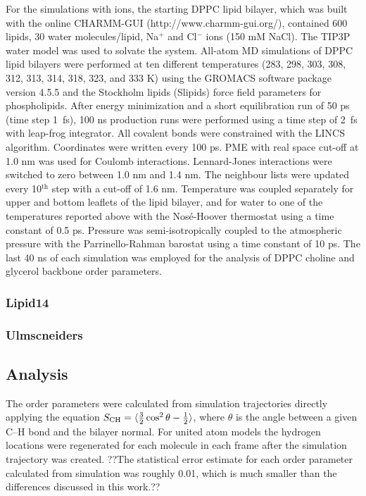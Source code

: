 \documentclass[pre,aps,floatfix,authordate1-4,twocolumn]{revtex4-1}
\begin{document}
For the simulations with ions, the starting DPPC lipid bilayer, which was built with the online CHARMM-GUI
(http://www.charmm-gui.org/), contained 600 lipids, 30 water molecules/lipid, Na$^+$ and Cl$^-$ ions (150 mM NaCl). 
The TIP3P water model was used to solvate the system. All-atom MD simulations of DPPC lipid bilayers were performed 
at ten different temperatures (283, 298, 303, 308, 312, 313, 314, 318, 323, and 333 K) using the GROMACS software 
package version 4.5.5 and the Stockholm lipids (Slipids) force field parameters for phospholipids. After energy 
minimization and a short equilibration run of 50 ps (time step 1~fs), 100 ns production runs were performed using 
a time step of 2~fs with leap-frog integrator. All covalent bonds were constrained with the LINCS
algorithm. Coordinates were written every 100 ps. PME with real space cut-off at 1.0 nm was used for Coulomb 
interactions. Lennard-Jones interactions were switched to zero between 1.0 nm and 1.4 nm. The neighbour 
lists were updated every 10$^\mathrm{th}$ step with a cut-off of 1.6 nm. Temperature was coupled separately for upper and 
bottom leaflets of the lipid bilayer, and for water to one of the temperatures reported above with the Nos\'e-Hoover 
thermostat using a time constant of 0.5 ps. Pressure was semi-isotropically coupled to the atmospheric pressure 
with the Parrinello-Rahman barostat using a time constant of 10 ps.
The last 40 ns of each simulation was employed for the analysis of DPPC choline and glycerol backbone order parameters.

\subsubsection{Lipid14}


\subsubsection{Ulmscneiders}


\subsection{Analysis}
The order parameters were calculated from simulation trajectories directly applying the equation
$S_{{\rm CH}}=\langle \frac{3}{2}  \cos^2 \theta-\frac{1}{2} \rangle$,
where $\theta$ is the angle between a given C--H bond and the bilayer normal.
 For united atom models the hydrogen locations
were regenerated for each molecule in each frame after the simulation trajectory was created.
??The statistical error estimate for each order parameter calculated from simulation was roughly
0.01, which is much smaller than the differences discussed in this work.??



\onecolumngrid
\listoftodos



\end{document}
